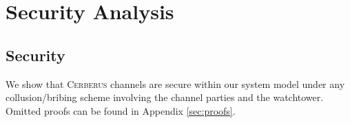 \documentclass[runningheads]{llncs}
\newcommand{\sys}{\textsc{Cerberus}\xspace}
\begin{document}



\section{Security Analysis}

\subsection{Security}
We show that \sys channels are secure within our system model under any collusion/bribing scheme involving the channel parties and the watchtower.
Omitted proofs can be found in Appendix \ref{sec:proofs}.
\end{document}
